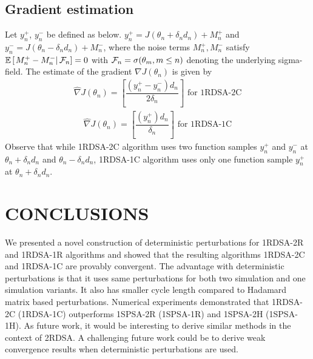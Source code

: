 \documentclass[letterpaper, 10 pt, conference]{ieeeconf}  %
\begin{document}
\subsection{Gradient estimation}
Let $y_{n}^{+}$, $y_{n}^{-}$  be defined as below.
$y_{n}^{+} = J(\theta_n+\delta_n d_n) + M_{n}^{+}$ and 
$y_{n}^{-} = J(\theta_n-\delta_n d_n) + M_{n}^{-}$,
where the noise terms $M_{n}^{+}, M_{n}^{-}$ satisfy $\mathbb{E}\left[\left.M_{n}^{+}- 
M_{n}^{-}\right| \mathcal{F}_n\right] = 0$ with $\mathcal{F}_n = \sigma(\theta_m, m\le n)$ 
denoting the underlying sigma-field. 
The estimate of the gradient $\nabla J(\theta_n)$ is given by
\begin{align}
\label{eq:grad-twosided}
\widehat\nabla J(\theta_n)=
\left[\dfrac{(y_{n}^{+} - y_{n}^{-})d_n}{2\delta_n}\right] \text{ for 1RDSA-2C}
\end{align}
\begin{align}
\label{eq:grad-onesided}
\widehat\nabla J(\theta_n)=
\left[\dfrac{(y_{n}^{+})d_n}{\delta_n}\right] \text{ for 1RDSA-1C}
\end{align}
Observe that while 1RDSA-2C algorithm uses two function samples $y_{n}^{+}$ and $y_{n}^{-}$ 
at $\theta_n+\delta_n d_n$ and $\theta_n - \delta_n d_n$, 1RDSA-1C algorithm 
uses only one function sample $y_{n}^{+}$ at $\theta_n+\delta_n d_n$.







\section{CONCLUSIONS}
\label{sec:conclusions}
We presented a novel construction of deterministic perturbations for 
1RDSA-2R and 1RDSA-1R algorithms and showed that the resulting algorithms 
1RDSA-2C and 1RDSA-1C are provably convergent. 
The advantage with deterministic perturbations is that it uses 
same perturbations for both two simulation
and one simulation variants. It also has smaller cycle length compared to Hadamard matrix
based perturbations. Numerical experiments demonstrated that 1RDSA-2C (1RDSA-1C) outperforms 
1SPSA-2R (1SPSA-1R) and 1SPSA-2H (1SPSA-1H).
As future work, it would be interesting to derive similar methods in the context of 
2RDSA. A challenging future work could be to derive weak convergence results when
deterministic perturbations are used.



\end{document}
